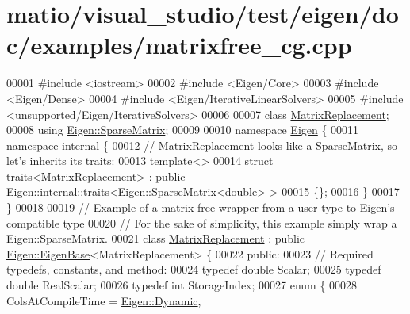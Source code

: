 \hypertarget{matio_2visual__studio_2test_2eigen_2doc_2examples_2matrixfree__cg_8cpp_source}{}\section{matio/visual\+\_\+studio/test/eigen/doc/examples/matrixfree\+\_\+cg.cpp}
\label{matio_2visual__studio_2test_2eigen_2doc_2examples_2matrixfree__cg_8cpp_source}

\begin{DoxyCode}
00001 \textcolor{preprocessor}{#include <iostream>}
00002 \textcolor{preprocessor}{#include <Eigen/Core>}
00003 \textcolor{preprocessor}{#include <Eigen/Dense>}
00004 \textcolor{preprocessor}{#include <Eigen/IterativeLinearSolvers>}
00005 \textcolor{preprocessor}{#include <unsupported/Eigen/IterativeSolvers>}
00006 
00007 \textcolor{keyword}{class }\hyperlink{class_matrix_replacement}{MatrixReplacement};
00008 \textcolor{keyword}{using} \hyperlink{group___sparse_core___module_class_eigen_1_1_sparse_matrix}{Eigen::SparseMatrix};
00009 
00010 \textcolor{keyword}{namespace }\hyperlink{namespace_eigen}{Eigen} \{
00011 \textcolor{keyword}{namespace }\hyperlink{namespaceinternal}{internal} \{
00012   \textcolor{comment}{// MatrixReplacement looks-like a SparseMatrix, so let's inherits its traits:}
00013   \textcolor{keyword}{template}<>
00014   \textcolor{keyword}{struct }traits<\hyperlink{class_matrix_replacement}{MatrixReplacement}> :  \textcolor{keyword}{public} 
      \hyperlink{struct_eigen_1_1internal_1_1traits}{Eigen::internal::traits}<Eigen::SparseMatrix<double> >
00015   \{\};
00016 \}
00017 \}
00018 
00019 \textcolor{comment}{// Example of a matrix-free wrapper from a user type to Eigen's compatible type}
00020 \textcolor{comment}{// For the sake of simplicity, this example simply wrap a Eigen::SparseMatrix.}
00021 \textcolor{keyword}{class }\hyperlink{class_matrix_replacement}{MatrixReplacement} : \textcolor{keyword}{public} \hyperlink{group___core___module_struct_eigen_1_1_eigen_base}{Eigen::EigenBase}<MatrixReplacement> \{
00022 \textcolor{keyword}{public}:
00023   \textcolor{comment}{// Required typedefs, constants, and method:}
00024   \textcolor{keyword}{typedef} \textcolor{keywordtype}{double} Scalar;
00025   \textcolor{keyword}{typedef} \textcolor{keywordtype}{double} RealScalar;
00026   \textcolor{keyword}{typedef} \textcolor{keywordtype}{int} StorageIndex;
00027   \textcolor{keyword}{enum} \{
00028     ColsAtCompileTime = \hyperlink{namespace_eigen_ad81fa7195215a0ce30017dfac309f0b2}{Eigen::Dynamic},

\end{DoxyCode}
